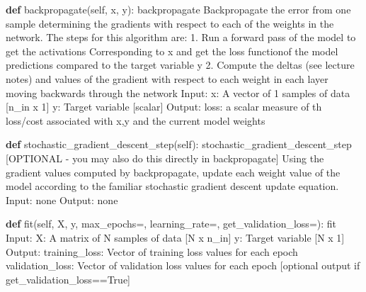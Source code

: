 \documentclass[
  letterpaper,
  DIV=11,
  numbers=noendperiod]{scrartcl}
\newenvironment{Shaded}{\begin{snugshade}}{\end{snugshade}}
\newcommand{\CommentTok}[1]{\textcolor[rgb]{0.37,0.37,0.37}{#1}}
\newcommand{\KeywordTok}[1]{\textcolor[rgb]{0.00,0.23,0.31}{\textbf{#1}}}
\newcommand{\NormalTok}[1]{\textcolor[rgb]{0.00,0.23,0.31}{#1}}
\newcommand{\OperatorTok}[1]{\textcolor[rgb]{0.37,0.37,0.37}{#1}}
\newcommand{\VariableTok}[1]{\textcolor[rgb]{0.07,0.07,0.07}{#1}}
\begin{document}
\begin{Shaded}
\begin{Highlighting}[]
    \KeywordTok{def}\NormalTok{ backpropagate(}\VariableTok{self}\NormalTok{, x, y):}
        \CommentTok{\textquotesingle{}\textquotesingle{}\textquotesingle{}backpropagate}
\CommentTok{        Backpropagate the error from one sample determining the gradients}
\CommentTok{        with respect to each of the weights in the network. The steps for}
\CommentTok{        this algorithm are:}
\CommentTok{            1. Run a forward pass of the model to get the activations }
\CommentTok{               Corresponding to x and get the loss functionof the model }
\CommentTok{               predictions compared to the target variable y}
\CommentTok{            2. Compute the deltas (see lecture notes) and values of the}
\CommentTok{               gradient with respect to each weight in each layer moving}
\CommentTok{               backwards through the network}
\CommentTok{    }
\CommentTok{            Input:}
\CommentTok{                x: A vector of 1 samples of data [n\_in x 1]}
\CommentTok{                y: Target variable [scalar]}
\CommentTok{            Output:}
\CommentTok{                loss: a scalar measure of th loss/cost associated with x,y}
\CommentTok{                      and the current model weights}
\CommentTok{        \textquotesingle{}\textquotesingle{}\textquotesingle{}}
        
    \KeywordTok{def}\NormalTok{ stochastic\_gradient\_descent\_step(}\VariableTok{self}\NormalTok{):}
        \CommentTok{\textquotesingle{}\textquotesingle{}\textquotesingle{}stochastic\_gradient\_descent\_step [OPTIONAL {-} you may also do this}
\CommentTok{        directly in backpropagate]}
\CommentTok{        Using the gradient values computed by backpropagate, update each}
\CommentTok{        weight value of the model according to the familiar stochastic}
\CommentTok{        gradient descent update equation.}
\CommentTok{        }
\CommentTok{        Input: none}
\CommentTok{        Output: none}
\CommentTok{        \textquotesingle{}\textquotesingle{}\textquotesingle{}}
    
    \KeywordTok{def}\NormalTok{ fit(}\VariableTok{self}\NormalTok{, X, y, max\_epochs}\OperatorTok{=}\NormalTok{, learning\_rate}\OperatorTok{=}\NormalTok{, get\_validation\_loss}\OperatorTok{=}\NormalTok{):}
        \CommentTok{\textquotesingle{}\textquotesingle{}\textquotesingle{}fit}
\CommentTok{            Input:}
\CommentTok{                X: A matrix of N samples of data [N x n\_in]}
\CommentTok{                y: Target variable [N x 1]}
\CommentTok{            Output:}
\CommentTok{                training\_loss:   Vector of training loss values for each epoch}
\CommentTok{                validation\_loss: Vector of validation loss values for each epoch}
\CommentTok{                                 [optional output if get\_validation\_loss==True]}
\CommentTok{        \textquotesingle{}\textquotesingle{}\textquotesingle{}}
            

\end{Highlighting}
\end{Shaded}
\end{document}
